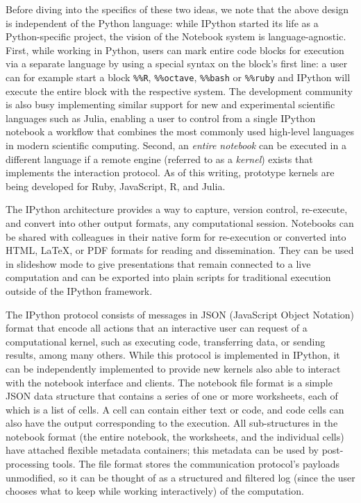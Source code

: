\documentclass[ChapterTOCs,krantz2]{krantz} %
\begin{document}
Before diving into the specifics of these two ideas, we note that the above
design is independent of the Python language: while IPython started its life as
a Python-specific project, the vision of the Notebook system is
language-agnostic.  First, while working in Python, users can mark entire code
blocks for execution via a separate language by using a special syntax on the
block's first line: a user can for example start a block \texttt{\%\%R},
\texttt{\%\%octave}, \texttt{\%\%bash} or \texttt{\%\%ruby} and IPython will
execute the entire block with the respective system.  The development community
is also busy implementing similar support for new and experimental
scientific languages such as Julia, enabling a user to control from a single
IPython notebook a workflow that combines the most commonly used high-level
languages in modern scientific computing.  Second, an \emph{entire notebook}
can be executed in a different language if a remote engine (referred to as a
\emph{kernel}) exists that implements the interaction protocol.  As of this
writing, prototype kernels are being developed for Ruby, JavaScript, R, and
Julia.

The IPython architecture provides a way to capture, version control, re-execute,
and convert into other output formats, any computational session.  Notebooks
can be shared with colleagues in their native form for re-execution or
converted into HTML, \LaTeX{}, or PDF formats for reading and dissemination.  They
can be used in slideshow mode to give presentations that remain connected to a
live computation and can be exported into plain scripts for traditional
execution outside of the IPython framework.

The IPython protocol consists of messages in JSON (JavaScript Object Notation)
format that encode all actions that an interactive user can request of a
computational kernel, such as executing code, transferring data, or sending
results, among many others.  While this protocol is implemented in IPython, it
can be independently implemented to provide new kernels also able to interact
with the notebook interface and clients.  The notebook file format is a simple
JSON data structure that contains a series of one or more worksheets, each of
which is a list of cells.  A cell can contain either text or code, and code
cells can also have the output corresponding to the execution.  All
sub-structures in the notebook format (the entire notebook, the worksheets, and
the individual cells) have attached flexible metadata containers; this metadata
can be used by post-processing tools.  The file format stores the communication
protocol's payloads unmodified, so it can be thought of as a structured and
filtered log (since the user chooses what to keep while working interactively)
of the computation.  
\end{document}
